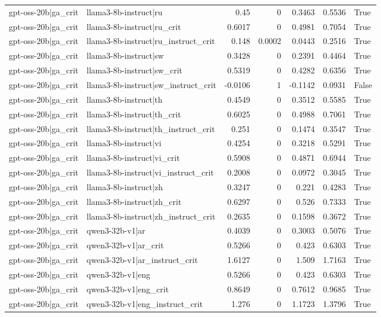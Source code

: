 \begin{table}
\begin{tabular}{l l r r r r l}
gpt-oss-20b|ga_crit & llama3-8b-instruct|ru & 0.45 & 0 & 0.3463 & 0.5536 & True \\
gpt-oss-20b|ga_crit & llama3-8b-instruct|ru_crit & 0.6017 & 0 & 0.4981 & 0.7054 & True \\
gpt-oss-20b|ga_crit & llama3-8b-instruct|ru_instruct_crit & 0.148 & 0.0002 & 0.0443 & 0.2516 & True \\
gpt-oss-20b|ga_crit & llama3-8b-instruct|sw & 0.3428 & 0 & 0.2391 & 0.4464 & True \\
gpt-oss-20b|ga_crit & llama3-8b-instruct|sw_crit & 0.5319 & 0 & 0.4282 & 0.6356 & True \\
gpt-oss-20b|ga_crit & llama3-8b-instruct|sw_instruct_crit & -0.0106 & 1 & -0.1142 & 0.0931 & False \\
gpt-oss-20b|ga_crit & llama3-8b-instruct|th & 0.4549 & 0 & 0.3512 & 0.5585 & True \\
gpt-oss-20b|ga_crit & llama3-8b-instruct|th_crit & 0.6025 & 0 & 0.4988 & 0.7061 & True \\
gpt-oss-20b|ga_crit & llama3-8b-instruct|th_instruct_crit & 0.251 & 0 & 0.1474 & 0.3547 & True \\
gpt-oss-20b|ga_crit & llama3-8b-instruct|vi & 0.4254 & 0 & 0.3218 & 0.5291 & True \\
gpt-oss-20b|ga_crit & llama3-8b-instruct|vi_crit & 0.5908 & 0 & 0.4871 & 0.6944 & True \\
gpt-oss-20b|ga_crit & llama3-8b-instruct|vi_instruct_crit & 0.2008 & 0 & 0.0972 & 0.3045 & True \\
gpt-oss-20b|ga_crit & llama3-8b-instruct|zh & 0.3247 & 0 & 0.221 & 0.4283 & True \\
gpt-oss-20b|ga_crit & llama3-8b-instruct|zh_crit & 0.6297 & 0 & 0.526 & 0.7333 & True \\
gpt-oss-20b|ga_crit & llama3-8b-instruct|zh_instruct_crit & 0.2635 & 0 & 0.1598 & 0.3672 & True \\
gpt-oss-20b|ga_crit & qwen3-32b-v1|ar & 0.4039 & 0 & 0.3003 & 0.5076 & True \\
gpt-oss-20b|ga_crit & qwen3-32b-v1|ar_crit & 0.5266 & 0 & 0.423 & 0.6303 & True \\
gpt-oss-20b|ga_crit & qwen3-32b-v1|ar_instruct_crit & 1.6127 & 0 & 1.509 & 1.7163 & True \\
gpt-oss-20b|ga_crit & qwen3-32b-v1|eng & 0.5266 & 0 & 0.423 & 0.6303 & True \\
gpt-oss-20b|ga_crit & qwen3-32b-v1|eng_crit & 0.8649 & 0 & 0.7612 & 0.9685 & True \\
gpt-oss-20b|ga_crit & qwen3-32b-v1|eng_instruct_crit & 1.276 & 0 & 1.1723 & 1.3796 & True \\

\end{tabular}
\end{table}
